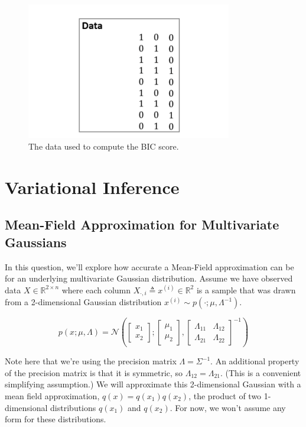 \documentclass[a3paper,12pt]{extarticle} %
\begin{document}
\begin{figure}[H]
\centering
\includegraphics[width=0.8\textwidth]{q2.png}
\caption{The data used to compute the BIC score.}
\label{fig:data}
\end{figure}

\newpage
\section{Variational Inference}
\subsection{Mean-Field Approximation for Multivariate Gaussians}
In this question, we’ll explore how accurate a Mean-Field approximation can be for an underlying multivariate Gaussian distribution. Assume we have observed data \( X \in \mathbb{R}^{2 \times n} \) where each column \( X_{\cdot,i} \triangleq x^{(i)} \in \mathbb{R}^2 \) is a sample that was drawn from a 2-dimensional Gaussian distribution \( x^{(i)} \sim p(\cdot; \mu, \Lambda^{-1}) \).

\[
p(x; \mu, \Lambda) = \mathcal{N} \left( 
\begin{bmatrix}
x_1 \\
x_2
\end{bmatrix}
;
\begin{bmatrix}
\mu_1 \\
\mu_2
\end{bmatrix}
,
\begin{bmatrix}
\Lambda_{11} & \Lambda_{12} \\
\Lambda_{21} & \Lambda_{22}
\end{bmatrix}^{-1}
\right)
\tag{1}
\]

Note here that we’re using the precision matrix \( \Lambda = \Sigma^{-1} \). An additional property of the precision matrix is that it is symmetric, so \( \Lambda_{12} = \Lambda_{21} \). (This is a convenient simplifying assumption.) We will approximate this 2-dimensional Gaussian with a mean field approximation, \( q(x) = q(x_1)q(x_2) \), the product of two 1-dimensional distributions \( q(x_1) \) and \( q(x_2) \). For now, we won’t assume any form for these distributions.
\end{document}
